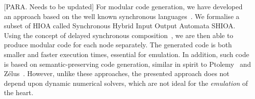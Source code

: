 {\color{red}[PARA. Needs to be updated]} 
For modular code generation, we have developed an approach based on the
well known synchronous languages~\cite{benveniste03}.  We formalise a
 subset of \ac{HIOA} called Synchronous
Hybrid Input Output Automata \ac{SHIOA}. Using the concept of delayed
synchronous composition~\cite{boussinot96}, we are then able to produce
modular code for each node separately. The generated code is both
smaller and faster execution times, essential for emulation. In
addition, such code is based on semantic-preserving code generation,
similar in spirit to Ptolemy~\cite{ptolemaeus2014system} and
Z\'{e}lus~\cite{bourke13zelus}.  However, unlike these approaches, the
presented approach does not depend upon dynamic numerical solvers, which
are not ideal for the \textit{emulation} of the heart.

